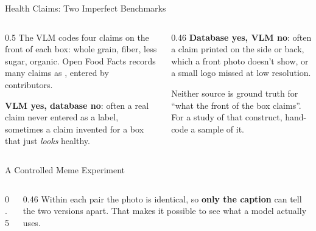 \begin{frame}{Health Claims: Two Imperfect Benchmarks}
\begin{columns}[T]
\begin{column}{0.5\textwidth}
The VLM codes four claims on the front of each box: whole grain, fiber, less sugar, organic.
Open Food Facts records many claims as , entered by contributors.

\vspace{0.2cm}
\textbf{VLM yes, database no}: often a real claim never entered as a label, sometimes a claim
invented for a box that just \emph{looks} healthy.
\end{column}
\begin{column}{0.46\textwidth}
\textbf{Database yes, VLM no}: often a claim printed on the side or back, which a front photo
doesn't show, or a small logo missed at low resolution.

\vspace{0.2cm}
\begin{graybox}
Neither source is ground truth for ``what the front of the box claims''. For a study of that
construct, hand-code a sample of it.
\end{graybox}
\end{column}
\end{columns}
\end{frame}

\begin{frame}{A Controlled Meme Experiment}
\begin{columns}[T]
\begin{column}{0.5\textwidth}
\centering
{}\\[3pt]
\end{column}
\begin{column}{0.46\textwidth}
Within each pair the photo is identical, so \textbf{only the caption} can tell the two versions
apart. That makes it possible to see what a model actually uses.

\vspace{0.15cm}
\end{column}
\end{columns}
\end{frame}

